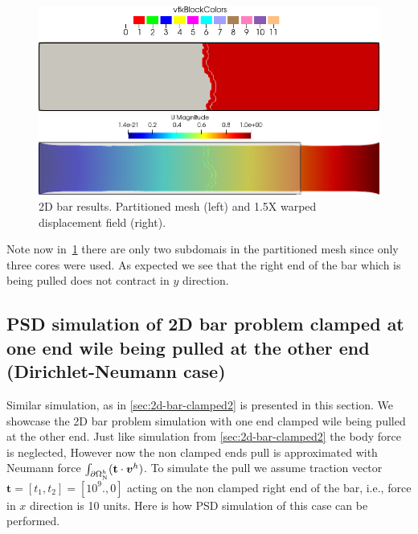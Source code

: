 \documentclass{report}
\newcommand{\bvh}{\boldsymbol v^h}
\begin{document}
\begin{figure}[htbp]
    \centering
    \begin{minipage}[t][2cm][t]{0.39\textwidth}
    \includegraphics[align=t,width=1\textwidth]{2d-bar-clamped-pulled-partioned.png}
    \end{minipage}\hspace{.1\textwidth}
    \begin{minipage}[t][2cm][t]{0.5\textwidth}
    \includegraphics[align=t,width=1\textwidth]{2d-bar-clamped-pulled.png}
    \end{minipage}
    \caption{2D bar results. Partitioned mesh (left) and 1.5X warped displacement field (right).}
    \label{fig:2part}
\end{figure}

Note now in~\cref{fig:2part} there are only two subdomais in the partitioned mesh since only three cores were used. As expected we see that the right end of the bar which is being pulled does not contract in $y$ direction.
\pagebreak


\subsection{PSD simulation of 2D bar problem clamped at one end wile being pulled at the other end (Dirichlet-Neumann case)\label{sec:2d-bar-clamped3}}


Similar simulation, as in \cref{sec:2d-bar-clamped2} is presented in this section. We showcase the 2D bar problem simulation with one end clamped wile being pulled at the other end. Just like simulation from \cref{sec:2d-bar-clamped2} the body force is neglected, However now  the non clamped ends pull is approximated with Neumann force $\int_{\partial\Omega^h_{\text N}}(\mathbf t\cdot \bvh)$. To simulate the pull we assume traction vector $\mathbf t=[t_1,t_2]=[10^9.,0]$ acting on the non clamped right end of the bar, i.e., force in $x$ direction is 10 units. Here is how PSD simulation of this case can be performed.
\end{document}

